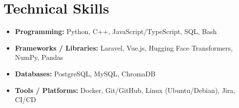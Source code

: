 
\section{Technical Skills}

\begin{itemize}
    \item \textbf{Programming:} Python, C++, JavaScript/TypeScript, SQL, Bash
    \item \textbf{Frameworks / Libraries:} Laravel, Vue.js, Hugging Face Transformers, NumPy, Pandas
    \item \textbf{Databases:} PostgreSQL, MySQL, ChromaDB
    \item \textbf{Tools / Platforms:} Docker, Git/GitHub, Linux (Ubuntu/Debian), Jira, CI/CD
\end{itemize}
